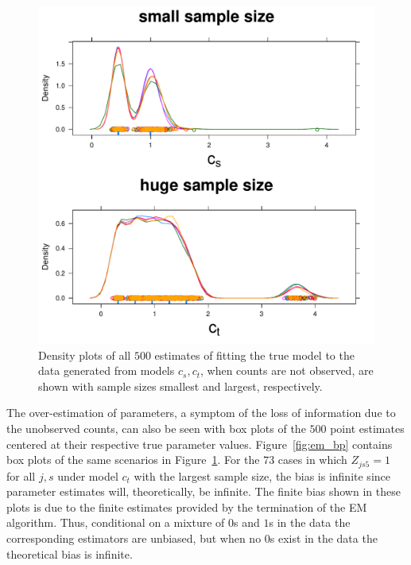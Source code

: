 \begin{figure}
  \centering
  \includegraphics[scale=0.5]{em}
  \caption{Density plots of all $500$ estimates of fitting the true model to the data generated from models $c_s,c_t$, when counts are not observed, are shown with sample sizes smallest and largest, respectively.}
  \label{fig:em}
\end{figure}

The over-estimation of parameters, a symptom of the loss of information due to the unobserved counts, can also be seen with box plots of the $500$ point estimates centered at their respective true parameter values.  Figure~\ref{fig:em_bp} contains box plots of the same scenarios in Figure~\ref{fig:em}.  For the $73$ cases in which $Z_{js5} = 1$ for all $j,s$ under model $c_t$ with the largest sample size, the bias is infinite since parameter estimates will, theoretically, be infinite.  The finite bias shown in these plots is due to the finite estimates provided by the termination of the EM algorithm.  Thus, conditional on a mixture of $0$s and $1$s in the data the corresponding estimators are unbiased, but when no $0$s exist in the data the theoretical bias is infinite.  

